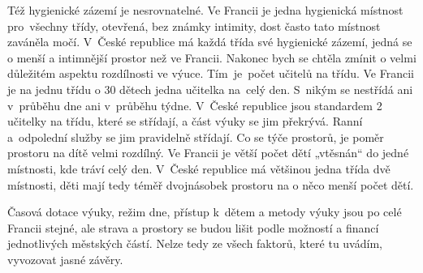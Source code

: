 		Též hygienické zázemí je nesrovnatelné. Ve Francii je jedna hygienická místnost pro všechny třídy, otevřená, bez známky intimity, dost často tato místnost zaváněla močí. V České republice má každá třída své hygienické zázemí, jedná se o menší a intimnější prostor než ve Francii.
		Nakonec bych se chtěla zmínit o velmi důležitém aspektu rozdílnosti ve výuce. Tím je počet učitelů na třídu. Ve Francii je na jednu třídu o 30 dětech jedna učitelka na celý den. S nikým se nestřídá ani v průběhu dne ani v průběhu týdne. V České republice jsou standardem 2 učitelky na třídu, které se střídají, a část výuky se jim překrývá. Ranní a odpolední služby se jim pravidelně střídají. Co se týče prostorů, je poměr prostoru na dítě velmi rozdílný. Ve Francii je větší počet dětí „vtěsnán“ do jedné místnosti, kde tráví celý den. V České republice má většinou jedna třída dvě místnosti, děti mají tedy téměř dvojnásobek prostoru na o něco menší počet dětí.

		
		Časová dotace výuky, režim dne, přístup k dětem a metody výuky jsou po celé Francii stejné, ale strava a prostory se budou lišit podle možností a financí jednotlivých městských částí. Nelze tedy ze všech faktorů, které tu uvádím, vyvozovat jasné závěry.
